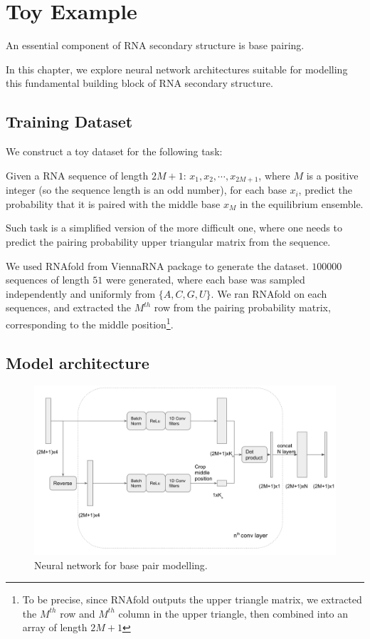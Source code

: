 \documentclass{proposal}
\begin{document}
\chapter{Toy Example}

An essential component of RNA secondary structure is base pairing.

In this chapter, we explore neural network architectures suitable for modelling this fundamental
building block of RNA secondary structure.

\section{Training Dataset}

We construct a toy dataset for the following task:

Given a RNA sequence of length $2M + 1$: $x_1, x_2, \cdots, x_{2M+1}$,
where $M$ is a positive integer (so the sequence length is an odd number),
for each base $x_i$, predict the probability that it is
paired with the middle base $x_M$ in the equilibrium ensemble.

Such task is a simplified version of the more difficult one,
where one needs to predict the pairing probability upper triangular matrix from the sequence.

We used RNAfold from ViennaRNA package\cite{lorenz2011viennarna} to generate the dataset.
$100000$ sequences of length $51$ were generated,
where each base was sampled independently and uniformly from $\{A, C, G, U\}$.
We ran RNAfold on each sequences, and extracted the $M^{th}$ row from the pairing probability
matrix, corresponding to the middle
position\footnote{To be precise, since RNAfold outputs the upper triangle matrix,
we extracted the $M^{th}$ row and $M^{th}$ column in the upper triangle, then combined into an array of length $2M+1$}.

\section{Model architecture}

\begin{figure}
    \centering
    \includegraphics[width=\textwidth]{plot/pair_prob_nn_plot.png}
    \caption{Neural network for base pair modelling.}
    \label{fig:base_pair_nn}
    \centering
\end{figure}
\end{document}
